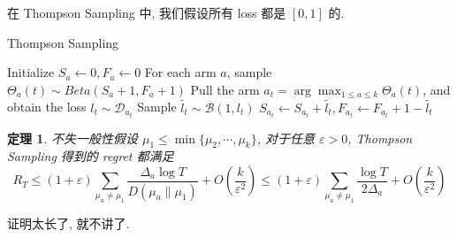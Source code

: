 \documentclass[8pt]{article}
\theoremstyle{compact}
\newtheorem{theorem}{定理}[section]
\def\le{\leqslant}
\begin{document}
在 Thompson Sampling 中, 我们假设所有 loss 都是 $[0, 1]$ 的.

\begin{algorithm}
	\caption{Thompson Sampling}
	\begin{algorithmic}[1]
		\State Initialize $S_a \gets 0, F_a \gets 0$
			\State For each arm $a$, sample $\Theta_a(t) \sim Beta(S_a + 1, F_a + 1)$
			\State Pull the arm $a_t = \arg \max_{1 \le a \le k}\Theta_a(t)$, and obtain the loss $l_t \sim \mathcal D_{a_t}$ 
			\State Sample $\tilde{l_t} \sim \mathcal B(1, l_t)$ 
			\State $S_{a_t} \gets S_{a_t} + \tilde{l_t}, F_{a_t} \gets F_{a_t} + 1 - \tilde{l_t}$
		\EndFor
	\end{algorithmic}
\end{algorithm}
\begin{theorem}
	不失一般性假设 $\mu_1 \le \min\{\mu_2, \cdots, \mu_k\}$, 对于任意 $\varepsilon > 0$, Thompson Sampling 得到的 regret 都满足 $$R_T \le (1 + \varepsilon)\sum_{\mu_a \neq \mu_1}\frac{\Delta_a\log T}{D(\mu_a \| \mu_1)} + O\left(\frac{k}{\varepsilon^2}\right) \le (1 + \varepsilon)\sum_{\mu_a \neq \mu_1}\frac{\log T}{2\Delta_a} + O\left(\frac{k}{\varepsilon^2}\right)$$
\end{theorem}

证明太长了, 就不讲了.
\end{document}

